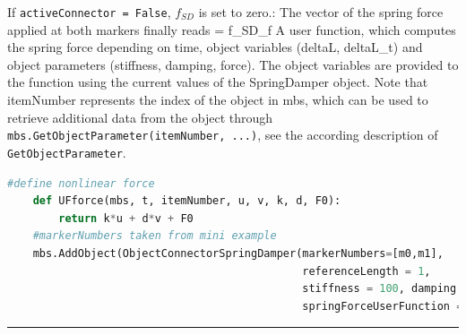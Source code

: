     If \texttt{activeConnector = False}, $f_{SD}$ is set to zero.:
    The vector of the spring force applied at both markers finally reads
    \be
      \fv = f_{SD}\vv_{f}
    \ee
    A user function, which computes the spring force depending on time, object variables (deltaL, deltaL\_t) and 
    object parameters (stiffness, damping, force).
    The object variables are provided to the function using the current values of the SpringDamper object.
    Note that itemNumber represents the index of the object in mbs, which can be used to retrieve additional data from the object through
    \texttt{mbs.GetObjectParameter(itemNumber, ...)}, see the according description of \texttt{GetObjectParameter}.
    \finishTable
    \userFunctionExample{}
    \pythonstyle
    \begin{lstlisting}[language=Python]
    #define nonlinear force
    def UFforce(mbs, t, itemNumber, u, v, k, d, F0): 
        return k*u + d*v + F0
    #markerNumbers taken from mini example
    mbs.AddObject(ObjectConnectorSpringDamper(markerNumbers=[m0,m1],
                                              referenceLength = 1, 
                                              stiffness = 100, damping = 1,
                                              springForceUserFunction = UFforce))
    \end{lstlisting} \vspace{12pt}
\vspace{6pt}\par\noindent\rule{\textwidth}{0.4pt}
